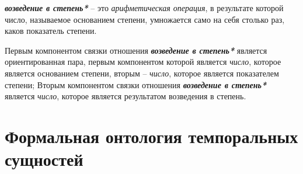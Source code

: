 \textbf{\textit{возведение в степень*}} -- это \textit{арифметическая операция}, в результате которой число, называемое основанием степени, умножается само на себя столько раз, каков показатель степени.
	
Первым компонентом связки отношения \textbf{\textit{возведение в степень*}} является ориентированная пара, первым компонентом которой является \textit{число}, которое является основанием степени, вторым -- \textit{число}, которое является показателем степени; Вторым компонентом связки отношения \textbf{\textit{возведение в степень*}} является \textit{число}, которое является результатом возведения в степень.

\begin{SCn}	
\end{SCn}
	
	
\section{Формальная онтология темпоральных сущностей}
\label{sec_top_ontologies_temp}
		
